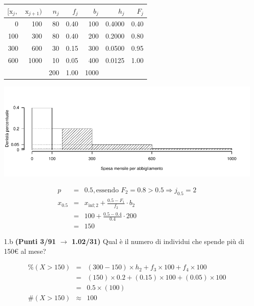\documentclass[
  11pt,
]{book}
\theoremstyle{mytheoremstyle}
\theoremstyle{mydefstyle}
\newenvironment{sol}
  {
  \begin{tcolorbox}[enhanced,breakable,arc=0.1mm,boxrule=1pt,colback=white,colframe=iblue,
  title=\bf \fontfamily{lmss}\selectfont \hspace{.5 cm} Soluzione,drop fuzzy shadow]

}{
\end{tcolorbox}
  }
\begin{document}
\begin{sol}

\begin{table}[H]
\centering
\begin{tabular}{rrrrrrr}
\toprule
$[\text{x}_j,$ & $\text{x}_{j+1})$ & $n_j$ & $f_j$ & $b_j$ & $h_j$ & $F_j$\\
\midrule
0 & 100 & 80 & 0.40 & 100 & 0.4000 & 0.40\\
100 & 300 & 80 & 0.40 & 200 & 0.2000 & 0.80\\
300 & 600 & 30 & 0.15 & 300 & 0.0500 & 0.95\\
600 & 1000 & 10 & 0.05 & 400 & 0.0125 & 1.00\\
 &  & 200 & 1.00 & 1000 &  & \\
\bottomrule
\end{tabular}
\end{table}

\begin{center}\includegraphics{Esami_passati_con_soluzioni_files/figure-latex/2023-221-1} \end{center}

\begin{eqnarray*}
  p &=&  0.5 , \text{essendo }F_{ 2 }= 0.8  > 0.5  \Rightarrow j_{ 0.5 }= 2 \\
  x_{ 0.5 } &=& x_{\text{inf}; 2 } + \frac{ { 0.5 } - F_{ 1 }} {f_{ 2 }} \cdot b_{ 2 } \\
            &=&  100  + \frac {{ 0.5 } -  0.4 } { 0.4 } \cdot  200  \\
            &=&  150 
\end{eqnarray*}

\end{sol}

1.b \textbf{(Punti 3/91 \(\rightarrow\) 1.02/31)} Qual è il numero di individui che spende più di 150€ al mese?

\begin{sol}
\begin{eqnarray*}
     \%(X> 150 ) &=& ( 300 - 150 )\times h_{ 2 }+ f_{ 3 }\times 100+f_{ 4 }\times 100 \\
              &=& ( 150 )\times 0.2 + ( 0.15 )\times 100+( 0.05 )\times 100 \\
              &=&  0.5 \times(100)\\
     \#(X> 150 ) &\approx& 100 
         \end{eqnarray*}

\end{sol}
\end{document}
